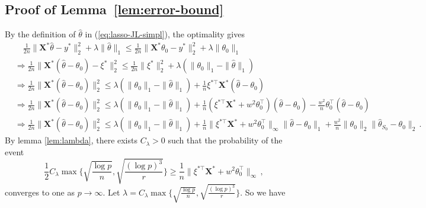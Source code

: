 \documentclass[11pt]{article}
\renewcommand{\hat}{\widehat}
\newcommand{\bX}{\boldsymbol{X}}
\begin{document}
\subsection{Proof of Lemma~\ref{lem:error-bound}}\label{pf:error-bound}
    By the definition of $\hat{\theta}$ in (\ref{eq:lasso-JL-simpl}), the optimality gives
    \begin{align*}
        &\quad\frac{1}{2n}\|\bX^*\hat{\theta}-y^*\|_2^2+\lambda\|\hat{\theta}\|_1\leq \frac{1}{2n}\|\bX^*\theta_0-y^*\|_2^2+\lambda\|\theta_0\|_1\\
        &\Rightarrow  \frac{1}{2n}\|\bX^*(\hat{\theta}-\theta_0)-\xi^*\|_2^2\leq \frac{1}{2n}\|\xi^*\|_2^2+\lambda(\|\theta_0\|_1-\|\hat{\theta}\|_1)\\
        &\Rightarrow  \frac{1}{2n}\|\bX^*(\hat{\theta}-\theta_0)\|_2^2\leq \lambda(\|\theta_0\|_1-\|\hat{\theta}\|_1) + \frac{1}{n} \xi^{*\top}\bX^*(\hat{\theta}-\theta_0)\\
        &\Rightarrow  \frac{1}{2n}\|\bX^*(\hat{\theta}-\theta_0)\|_2^2\leq \lambda(\|\theta_0\|_1-\|\hat{\theta}\|_1) + \frac{1}{n} (\xi^{*\top}\bX^*+w^2\theta_0^\top)(\hat{\theta}-\theta_0)-\frac{w^2}{n}\theta_0^\top(\hat{\theta}-\theta_0)\\
        &\Rightarrow \frac{1}{2n}\|\bX^*(\hat{\theta}-\theta_0)\|_2^2\leq \lambda(\|\theta_0\|_1-\|\hat{\theta}\|_1) + \frac{1}{n}\|\xi^{*\top}\bX^*+w^2\theta_0^\top\|_\infty\|\hat{\theta}-\theta_0\|_1+\frac{w^2}{n}\|\theta_0\|_2\|\hat{\theta}_{S_0}-\theta_0\|_2\,.
    \end{align*}
    By lemma \ref{lem:lambda}, there exists $C_\lambda>0$ such that the probability of the event 
    \begin{equation*}
        \frac{1}{2}C_\lambda\max\bigg\{\sqrt{\frac{\log p}{n}},\sqrt{\frac{(\log p)^3}{r}}\bigg\}\geq \frac{1}{n}\|\xi^{*\top}\bX^*+w^2\theta_0^\top\|_\infty\,,
    \end{equation*}
    converges to one as $p \to \infty$. Let $\lambda = C_\lambda\max\bigg\{\sqrt{\frac{\log p}{n}},\sqrt{\frac{(\log p)^3}{r}}\bigg\}$. So we have
\end{document}
